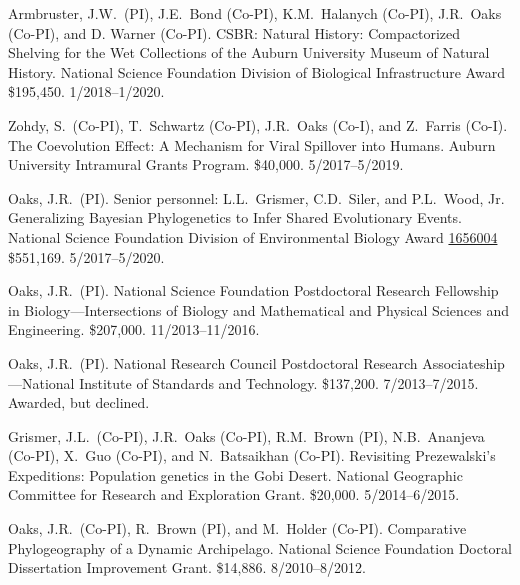 \myHangIndent
Armbruster, J.W.\ (PI),
J.E.\ Bond (Co-PI),
K.M.\ Halanych (Co-PI),
J.R.\ Oaks (Co-PI),
and
D. Warner (Co-PI).
CSBR: Natural History: Compactorized Shelving for the Wet Collections of the
Auburn University Museum of Natural History.
National Science Foundation Division of Biological Infrastructure Award
\$195,450.
1/2018--1/2020.

\myHangIndent
Zohdy, S.\ (Co-PI), T.\ Schwartz (Co-PI), J.R.\ Oaks (Co-I), and Z.\ Farris (Co-I).
The Coevolution Effect: A Mechanism for Viral Spillover into Humans.
Auburn University Intramural Grants Program.
\$40,000.
5/2017--5/2019.

\myHangIndent
Oaks, J.R.\ (PI).
Senior personnel: L.L.\ Grismer, C.D.\ Siler, and P.L.\ Wood, Jr.
Generalizing Bayesian Phylogenetics to Infer Shared Evolutionary Events.
National Science Foundation Division of Environmental Biology Award
\href{https://www.nsf.gov/awardsearch/showAward?AWD_ID=1656004&HistoricalAwards=false}{1656004}
\$551,169.
5/2017--5/2020.

\myHangIndent
Oaks, J.R.\ (PI).
National Science Foundation Postdoctoral Research Fellowship in
Biology---Intersections of Biology and Mathematical and Physical Sciences and
Engineering.
\$207,000.
11/2013--11/2016.

\myHangIndent
Oaks, J.R.\ (PI).
National Research Council Postdoctoral Research Associateship---National
Institute of Standards and Technology.
\$137,200.
7/2013--7/2015.
Awarded, but declined.

\myHangIndent
Grismer, J.L.\ (Co-PI), J.R.\ Oaks (Co-PI), R.M.\ Brown (PI), N.B.\ Ananjeva
(Co-PI), X.\ Guo (Co-PI), and N.\ Batsaikhan (Co-PI).
Revisiting Prezewalski's Expeditions: Population genetics in the Gobi Desert.
National Geographic Committee for Research and Exploration Grant.
\$20,000.
5/2014--6/2015.

\myHangIndent
Oaks, J.R.\ (Co-PI), R.\ Brown (PI), and M.\ Holder (Co-PI).
Comparative Phylogeography of a Dynamic Archipelago.
National Science Foundation Doctoral Dissertation Improvement Grant.
\$14,886.
8/2010--8/2012.
